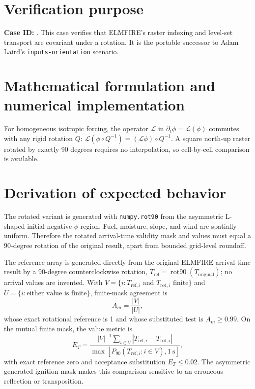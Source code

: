 \section{Verification purpose}

\textbf{Case ID:} \texttt{\CaseID}. This case verifies that ELMFIRE's raster indexing and level-set transport are covariant under a \RotationAngle{} rotation. It is the portable successor to Adam Laird's \texttt{inputs-orientation} scenario.

\section{Mathematical formulation and numerical implementation}

For homogeneous isotropic forcing, the operator $\mathcal{L}$ in $\partial_t\phi=\mathcal{L}(\phi)$ commutes with any rigid rotation $Q$: $\mathcal{L}(\phi\circ Q^{-1})=(\mathcal{L}\phi)\circ Q^{-1}$. A square north-up raster rotated by exactly 90 degrees requires no interpolation, so cell-by-cell comparison is available.

\section{Derivation of expected behavior}

The rotated variant is generated with \texttt{numpy.rot90} from the asymmetric L-shaped initial negative-$\phi$ region. Fuel, moisture, slope, and wind are spatially uniform. Therefore the rotated arrival-time validity mask and values must equal a 90-degree rotation of the original result, apart from bounded grid-level roundoff.

The reference array is generated directly from the original ELMFIRE
arrival-time result by a 90-degree counterclockwise rotation,
\(T_{\mathrm{ref}}=\operatorname{rot90}(T_{\mathrm{original}})\); no
arrival values are invented.  With
\(V=\{i:T_{\mathrm{ref},i}\text{ and }T_{\mathrm{rot},i}\text{ finite}\}\)
and \(U=\{i:\text{either value is finite}\}\), finite-mask agreement is
\[
 A_m=\frac{|V|}{|U|},
\]
whose exact rotational reference is 1 and whose substituted test is
\(A_m\geq0.99\).  On the mutual finite mask, the value metric is
\[
 E_T=\frac{|V|^{-1}\sum_{i\in V}
 |T_{\mathrm{ref},i}-T_{\mathrm{rot},i}|}
 {\max[P_{90}(T_{\mathrm{ref},i}:i\in V),1~\mathrm{s}]},
\]
with exact reference zero and acceptance substitution \(E_T\leq0.02\).
The asymmetric generated ignition mask makes this comparison sensitive to
an erroneous reflection or transposition.

